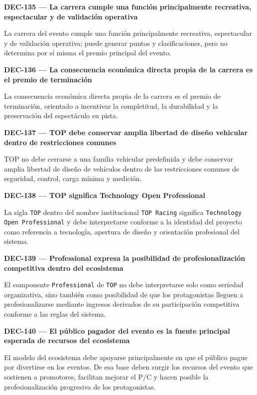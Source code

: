 \documentclass[10pt,letterpaper]{article}
\begin{document}
\noindent\textbf{DEC-135 --- La carrera cumple una función principalmente recreativa, espectacular y de validación operativa}\par
La carrera del evento cumple una función principalmente recreativa, espectacular y de validación operativa; puede generar puntos y clasificaciones, pero no determina por sí misma el premio principal del evento.\par\vspace{0.45em}
\noindent\textbf{DEC-136 --- La consecuencia económica directa propia de la carrera es el premio de terminación}\par
La consecuencia económica directa propia de la carrera es el premio de terminación, orientado a incentivar la completitud, la durabilidad y la preservación del espectáculo en pista.\par\vspace{0.45em}
\noindent\textbf{DEC-137 --- TOP debe conservar amplia libertad de diseño vehicular dentro de restricciones comunes}\par
TOP no debe cerrarse a una familia vehicular predefinida y debe conservar amplia libertad de diseño de vehículos dentro de las restricciones comunes de seguridad, control, carga mínima y medición.\par\vspace{0.45em}
\noindent\textbf{DEC-138 --- TOP significa Technology Open Professional}\par
La sigla \texttt{TOP} dentro del nombre institucional \texttt{TOP Racing} significa \texttt{Technology Open Professional} y debe interpretarse conforme a la identidad del proyecto como referencia a tecnología, apertura de diseño y orientación profesional del sistema.\par\vspace{0.45em}
\noindent\textbf{DEC-139 --- Professional expresa la posibilidad de profesionalización competitiva dentro del ecosistema}\par
El componente \texttt{Professional} de \texttt{TOP} no debe interpretarse solo como seriedad organizativa, sino también como posibilidad de que los protagonistas lleguen a profesionalizarse mediante ingresos derivados de su participación competitiva conforme a las reglas del sistema.\par\vspace{0.45em}
\noindent\textbf{DEC-140 --- El público pagador del evento es la fuente principal esperada de recursos del ecosistema}\par
El modelo del ecosistema debe apoyarse principalmente en que el público pague por divertirse en los eventos. De esa base deben surgir los recursos del evento que sostienen a promotores, facilitan mejorar el P/C y hacen posible la profesionalización progresiva de los protagonistas.\par\vspace{0.45em}
\end{document}
